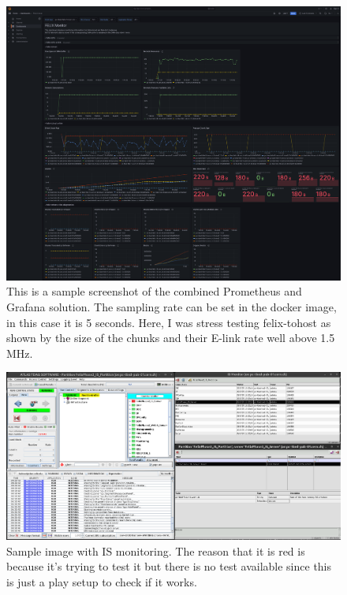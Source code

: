 \begin{figure}[htbp]
\centering
\includegraphics[width=\textwidth]{images/results/monitoring-merged.png}
\caption[Grafana sample screenshot]{This is a sample screenshot of the combined Prometheus and Grafana solution. The sampling rate can be set in the docker image, in this case it is 5 seconds. Here, I was stress testing felix-tohost as shown by the size of the chunks and their \acs{E-link} rate well above 1.5 MHz. }
\label{fig:felix-tohost-monitoring}
\end{figure}

\begin{figure}[H]
\centering
\includegraphics[width=\textwidth]{images/results/IS-monitoring.png}
\caption[IS monitoring screenshot]{Sample image with IS monitoring. The reason that it is red is because it's trying to test it but there is no test available since this is just a play setup to check if it works.}
\label{fig:felix-tohost-is}
\end{figure}


